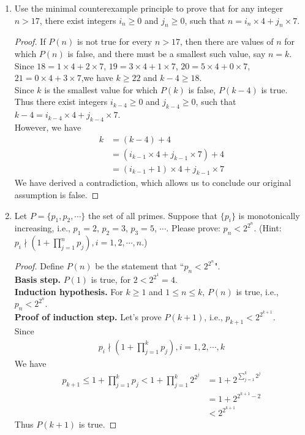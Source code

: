 \documentclass[12pt,a4paper]{article}
\theoremstyle{definition}
\begin{document}
\begin{enumerate}
	    \item
	    Use the minimal counterexample principle to prove that for any integer $n>17$, there exist integers $i_n\ge 0$ and $j_n\ge 0$, such that $n = i_n \times 4 + j_n \times 7$.
	    \begin{proof}
	    	\hfill \break
	    	If $P(n)$ is not true for every $n > 17$, then there are values of $n$ for which $P(n)$ is false, and there must be a smallest such value, say $n = k$. \\
	    	Since $18 = 1 \times 4 + 2 \times 7$,  $19 = 3 \times 4 + 1 \times 7$, $20 = 5 \times 4 + 0 \times 7$, $21 = 0 \times 4 + 3 \times 7$,we have $k \ge 22$ and $k - 4 \ge 18$. \\
	    	Since $k$ is the smallest value for which $P(k)$ is false, $P(k - 4)$ is true. Thus there exist integers $i_{k - 4}\ge 0$ and $j_{k - 4}\ge 0$, such that $k - 4 = i_{k - 4} \times 4 + j_{k - 4} \times 7$. \\
	    	However, we have 
	    	\begin{align*}
	    		k &= (k - 4) + 4\\
	    		&= (i_{k - 1} \times 4 + j_{k - 1} \times 7) + 4\\
	    		&= (i_{k - 1} + 1) \times 4 + j_{k - 1} \times 7
	    	\end{align*}
	    	We have derived a contradiction, which allows us to conclude our original assumption is false. 
	    \end{proof}
    
	    \item
	    Let $P=\{p_1, p_2, \cdots\}$ the set of all primes. Suppose that $\{p_i\}$ is monotonically    increasing, i.e., $p_1=2$, $p_2=3$, $p_3=5$, $\cdots$. Please prove: $p_n<2^{2^n}$. {\color{blue}(Hint: $p_i \nmid (1+\prod_{j=1}^n p_j), i=1,2,\cdots,n$.)}
	    \begin{proof}
	    	\hfill \break
	    	Define $P(n)$ be the statement that ``$p_n < 2^{2^n}$". \\
	    	\textbf{Basis step.} $P(1)$ is true, for $2 < 2^{2^1} = 4$. \\
	    	\textbf{Induction hypothesis.} For $k \geq 1$ and $1 \leq n \leq k$, $P(n)$ is true, i.e., $p_n < 2^{2^n}$. \\
	    	\textbf{Proof of induction step.} Let's prove $P(k + 1)$, i.e., $p_{k + 1} < 2^{2^{k + 1}}$. \\
	    	Since 
	    	\begin{align*}
	    		p_i \nmid (1+\prod_{j=1}^k p_j), i=1,2,\cdots,k
	    	\end{align*}
	    	We have 
    		\begin{align*}
				p_{k + 1} \leq 1+\prod_{j=1}^k p_j < 1 + \prod_{j = 1}^k 2^{2^j} &= 1+ 2^{\sum_{j = 1}^{k} 2^j} \\
				&= 1 + 2^{2^{k + 1} - 2} \\
				&< 2^{2^{k + 1}}
    		\end{align*}
    		Thus $P(k + 1)$ is true. 
	    \end{proof}
	

\end{enumerate}
\end{document}
